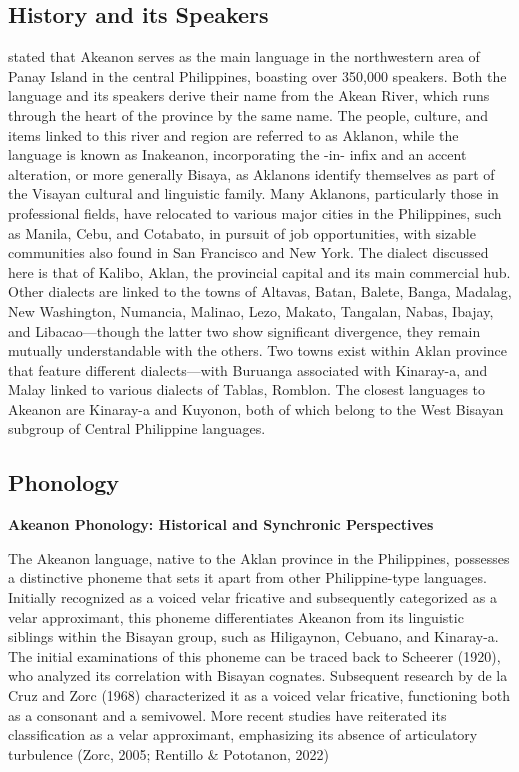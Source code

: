 \subsection{History and its Speakers}
 stated that Akeanon serves as the main language in the northwestern area of Panay Island in the central Philippines, boasting over 350,000 speakers. Both the language and its speakers derive their name from the Akean River, which runs through the heart of the province by the same name. The people, culture, and items linked to this river and region are referred to as Aklanon, while the language is known as Inakeanon, incorporating the -in- infix and an accent alteration, or more generally Bisaya, as Aklanons identify themselves as part of the Visayan cultural and linguistic family. Many Aklanons, particularly those in professional fields, have relocated to various major cities in the Philippines, such as Manila, Cebu, and Cotabato, in pursuit of job opportunities, with sizable communities also found in San Francisco and New York. The dialect discussed here is that of Kalibo, Aklan, the provincial capital and its main commercial hub. Other dialects are linked to the towns of Altavas, Batan, Balete, Banga, Madalag, New Washington, Numancia, Malinao, Lezo, Makato, Tangalan, Nabas, Ibajay, and Libacao—though the latter two show significant divergence, they remain mutually understandable with the others. Two towns exist within Aklan province that feature different dialects—with Buruanga associated with Kinaray-a, and Malay linked to various dialects of Tablas, Romblon. The closest languages to Akeanon are Kinaray-a and Kuyonon, both of which belong to the West Bisayan subgroup of Central Philippine languages.

\subsection{Phonology}
\textbf{Akeanon Phonology: Historical and Synchronic Perspectives}
  
The Akeanon language, native to the Aklan province in the Philippines, possesses a distinctive phoneme that sets it apart from other Philippine-type languages. Initially recognized as a voiced velar fricative and subsequently categorized as a velar approximant, this phoneme differentiates Akeanon from its linguistic siblings within the Bisayan group, such as Hiligaynon, Cebuano, and Kinaray-a. The initial examinations of this phoneme can be traced back to Scheerer (1920), who analyzed its correlation with Bisayan cognates. Subsequent research by de la Cruz and Zorc (1968) characterized it as a voiced velar fricative, functioning both as a consonant and a semivowel. More recent studies have reiterated its classification as a velar approximant, emphasizing its absence of articulatory turbulence (Zorc, 2005; Rentillo \& Pototanon, 2022) 

